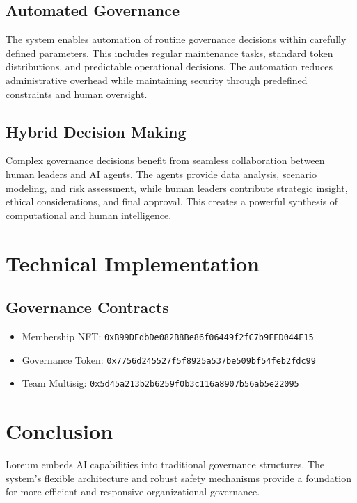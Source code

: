 \documentclass[12pt]{article}
\begin{document}
\subsection{Automated Governance}
The system enables automation of routine governance decisions within carefully defined parameters. This includes regular maintenance tasks, standard token distributions, and predictable operational decisions. The automation reduces administrative overhead while maintaining security through predefined constraints and human oversight.

\subsection{Hybrid Decision Making}
Complex governance decisions benefit from seamless collaboration between human leaders and AI agents. The agents provide data analysis, scenario modeling, and risk assessment, while human leaders contribute strategic insight, ethical considerations, and final approval. This creates a powerful synthesis of computational and human intelligence.

\section{Technical Implementation}

\subsection{Governance Contracts}
\begin{itemize}
    \item Membership NFT: \texttt{0xB99DEdbDe082B8Be86f06449f2fC7b9FED044E15}
    \item Governance Token: \texttt{0x7756d245527f5f8925a537be509bf54feb2fdc99}
    \item Team Multisig: \texttt{0x5d45a213b2b6259f0b3c116a8907b56ab5e22095}
\end{itemize}

\section{Conclusion}
Loreum embeds AI capabilities into traditional governance structures. The system's flexible architecture and robust safety mechanisms provide a foundation for more efficient and responsive organizational governance.
\end{document}
